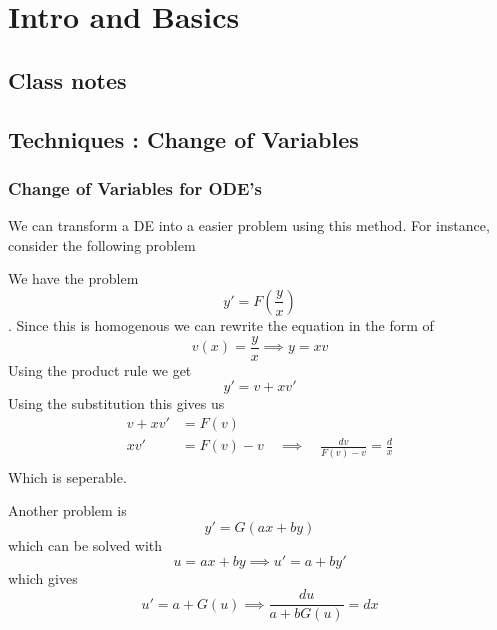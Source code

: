 \chapter{Intro and Basics}
\section{Class notes} 

\section{Techniques : Change of Variables}
\label{sec:Techniques : Change of Variables}
\subsection{Change of Variables for ODE's}
\label{subsec:Change of Variables for ODE's}
We can transform a DE into a easier problem using this method. For instance, consider the
following problem 
\begin{exmp}
We have the problem 
\[
y' = F\left( \frac{ y }{ x } \right)    
\]. Since this is homogenous we can rewrite the equation in the form of 
\[
v(x) = \frac{ y }{ x } \implies y = xv  
\]
Using the product rule we get 
\[
y' = v + xv' 
\] 
Using the substitution this gives us 
\begin{align*}
    v + xv' &= F(v) \\ 
    xv' &= F(v) - v \quad \implies \quad \frac{ dv  }{ F(v) - v } = \frac{ d }{ x }   \\ 
\end{align*}
Which is seperable.
\end{exmp}

\begin{exmp}
    Another problem is 
    \[
    y' = G\left( ax + by\right) 
    \] which can be solved with 
    \[
    u = ax + by \implies u' = a + by' 
    \]
    which gives 
    \[
        u' = a + G(u) \implies \frac{ du  }{ a + bG(u) } = dx
    \]
\end{exmp}
